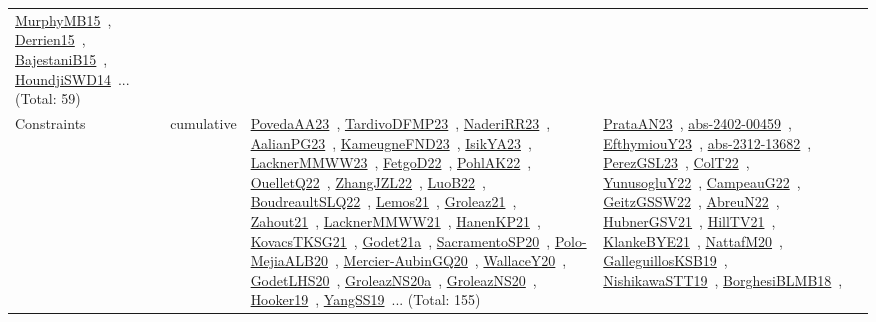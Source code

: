 {\begin{longtable}{lp{3cm}>{\raggedright\arraybackslash}p{6cm}>{\raggedright\arraybackslash}p{6cm}>{\raggedright\arraybackslash}p{8cm}}
\href{works/MurphyMB15.pdf}{MurphyMB15}~\cite{MurphyMB15}, \href{works/Derrien15.pdf}{Derrien15}~\cite{Derrien15}, \href{works/BajestaniB15.pdf}{BajestaniB15}~\cite{BajestaniB15}, \href{works/HoundjiSWD14.pdf}{HoundjiSWD14}~\cite{HoundjiSWD14}... (Total: 59)\\
Constraints & cumulative & \href{works/PovedaAA23.pdf}{PovedaAA23}~\cite{PovedaAA23}, \href{works/TardivoDFMP23.pdf}{TardivoDFMP23}~\cite{TardivoDFMP23}, \href{works/NaderiRR23.pdf}{NaderiRR23}~\cite{NaderiRR23}, \href{works/AalianPG23.pdf}{AalianPG23}~\cite{AalianPG23}, \href{works/KameugneFND23.pdf}{KameugneFND23}~\cite{KameugneFND23}, \href{works/IsikYA23.pdf}{IsikYA23}~\cite{IsikYA23}, \href{works/LacknerMMWW23.pdf}{LacknerMMWW23}~\cite{LacknerMMWW23}, \href{works/FetgoD22.pdf}{FetgoD22}~\cite{FetgoD22}, \href{works/PohlAK22.pdf}{PohlAK22}~\cite{PohlAK22}, \href{works/OuelletQ22.pdf}{OuelletQ22}~\cite{OuelletQ22}, \href{works/ZhangJZL22.pdf}{ZhangJZL22}~\cite{ZhangJZL22}, \href{works/LuoB22.pdf}{LuoB22}~\cite{LuoB22}, \href{works/BoudreaultSLQ22.pdf}{BoudreaultSLQ22}~\cite{BoudreaultSLQ22}, \href{works/Lemos21.pdf}{Lemos21}~\cite{Lemos21}, \href{works/Groleaz21.pdf}{Groleaz21}~\cite{Groleaz21}, \href{works/Zahout21.pdf}{Zahout21}~\cite{Zahout21}, \href{works/LacknerMMWW21.pdf}{LacknerMMWW21}~\cite{LacknerMMWW21}, \href{works/HanenKP21.pdf}{HanenKP21}~\cite{HanenKP21}, \href{works/KovacsTKSG21.pdf}{KovacsTKSG21}~\cite{KovacsTKSG21}, \href{works/Godet21a.pdf}{Godet21a}~\cite{Godet21a}, \href{works/SacramentoSP20.pdf}{SacramentoSP20}~\cite{SacramentoSP20}, \href{works/Polo-MejiaALB20.pdf}{Polo-MejiaALB20}~\cite{Polo-MejiaALB20}, \href{works/Mercier-AubinGQ20.pdf}{Mercier-AubinGQ20}~\cite{Mercier-AubinGQ20}, \href{works/WallaceY20.pdf}{WallaceY20}~\cite{WallaceY20}, \href{works/GodetLHS20.pdf}{GodetLHS20}~\cite{GodetLHS20}, \href{works/GroleazNS20a.pdf}{GroleazNS20a}~\cite{GroleazNS20a}, \href{works/GroleazNS20.pdf}{GroleazNS20}~\cite{GroleazNS20}, \href{works/Hooker19.pdf}{Hooker19}~\cite{Hooker19}, \href{works/YangSS19.pdf}{YangSS19}~\cite{YangSS19}... (Total: 155) & \href{works/PrataAN23.pdf}{PrataAN23}~\cite{PrataAN23}, \href{works/abs-2402-00459.pdf}{abs-2402-00459}~\cite{abs-2402-00459}, \href{works/EfthymiouY23.pdf}{EfthymiouY23}~\cite{EfthymiouY23}, \href{works/abs-2312-13682.pdf}{abs-2312-13682}~\cite{abs-2312-13682}, \href{works/PerezGSL23.pdf}{PerezGSL23}~\cite{PerezGSL23}, \href{works/ColT22.pdf}{ColT22}~\cite{ColT22}, \href{works/YunusogluY22.pdf}{YunusogluY22}~\cite{YunusogluY22}, \href{works/CampeauG22.pdf}{CampeauG22}~\cite{CampeauG22}, \href{works/GeitzGSSW22.pdf}{GeitzGSSW22}~\cite{GeitzGSSW22}, \href{works/AbreuN22.pdf}{AbreuN22}~\cite{AbreuN22}, \href{works/HubnerGSV21.pdf}{HubnerGSV21}~\cite{HubnerGSV21}, \href{works/HillTV21.pdf}{HillTV21}~\cite{HillTV21}, \href{works/KlankeBYE21.pdf}{KlankeBYE21}~\cite{KlankeBYE21}, \href{works/NattafM20.pdf}{NattafM20}~\cite{NattafM20}, \href{works/GalleguillosKSB19.pdf}{GalleguillosKSB19}~\cite{GalleguillosKSB19}, \href{works/NishikawaSTT19.pdf}{NishikawaSTT19}~\cite{NishikawaSTT19}, \href{works/BorghesiBLMB18.pdf}{BorghesiBLMB18}~\cite{BorghesiBLMB18}, 
\end{longtable}}
